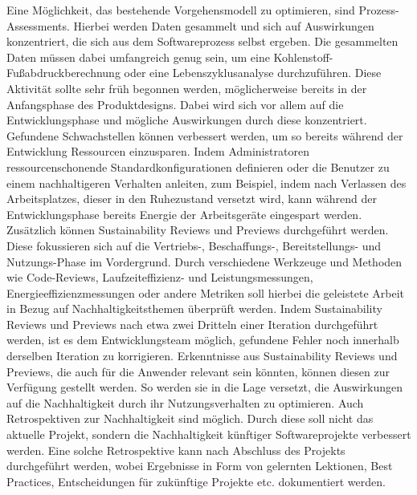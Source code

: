 \documentclass[utf8,biblatex]{lni}
\begin{document}
\newline
\newline
Eine Möglichkeit, das bestehende Vorgehensmodell zu optimieren, sind Prozess-Assessments. Hierbei werden Daten gesammelt und sich auf Auswirkungen konzentriert, die sich aus dem Softwareprozess selbst ergeben. Die gesammelten Daten müssen dabei umfangreich genug sein, um eine Kohlenstoff-Fußabdruckberechnung oder eine Lebenszyklusanalyse durchzuführen. Diese Aktivität sollte sehr früh begonnen werden, möglicherweise bereits in der Anfangsphase des Produktdesigns. Dabei wird sich vor allem auf die Entwicklungsphase und mögliche Auswirkungen durch diese konzentriert. Gefundene Schwachstellen können verbessert werden, um so bereits während der Entwicklung Ressourcen einzusparen. \cite{Dick13}
\newline
Indem Administratoren ressourcenschonende Standardkonfigurationen definieren oder die Benutzer zu einem nachhaltigeren Verhalten anleiten, zum Beispiel, indem nach Verlassen des Arbeitsplatzes, dieser in den Ruhezustand versetzt wird, kann während der Entwicklungsphase bereits Energie der Arbeitsgeräte eingespart werden. \cite{Johann11} 
\newline
Zusätzlich können Sustainability Reviews und Previews durchgeführt werden. Diese fokussieren sich auf die Vertriebs-, Beschaffungs-, Bereitstellungs- und Nutzungs-Phase im Vordergrund. Durch verschiedene Werkzeuge und Methoden wie Code-Reviews, Laufzeiteffizienz- und Leistungsmessungen, Energieeffizienzmessungen oder andere Metriken soll hierbei die geleistete Arbeit in Bezug auf Nachhaltigkeitsthemen überprüft werden. Indem Sustainability Reviews und Previews nach etwa zwei Dritteln einer Iteration durchgeführt werden, ist es dem Entwicklungsteam möglich, gefundene Fehler noch innerhalb derselben Iteration zu korrigieren. \cite{Dick13}
\newline
Erkenntnisse aus Sustainability Reviews und Previews, die auch für die Anwender relevant sein könnten, können diesen zur Verfügung gestellt werden. So werden sie in die Lage versetzt, die Auswirkungen auf die Nachhaltigkeit durch ihr Nutzungsverhalten zu optimieren. \cite{Johann11} 
\newline
Auch Retrospektiven zur Nachhaltigkeit sind möglich. Durch diese soll nicht das aktuelle Projekt, sondern die Nachhaltigkeit künftiger Softwareprojekte verbessert werden. Eine solche Retrospektive kann nach Abschluss des Projekts durchgeführt werden, wobei Ergebnisse in Form von gelernten Lektionen, Best Practices, Entscheidungen für zukünftige Projekte etc. dokumentiert werden. \cite{Dick13}
\end{document}
